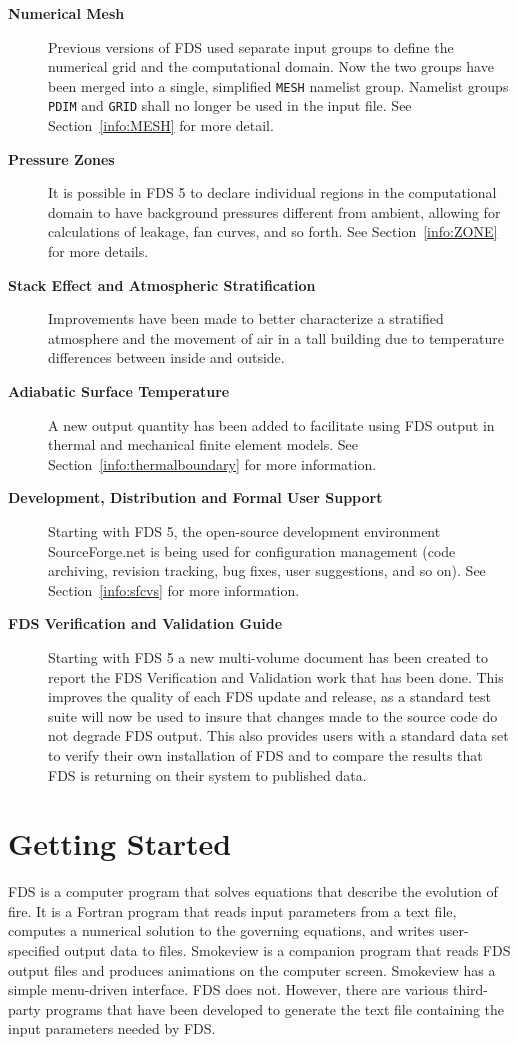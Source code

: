 \documentclass[11pt]{book}
\newcommand{\ct}{\tt\small}
\begin{document}
\begin{description}
\item[{\bf Numerical Mesh}] Previous versions of FDS used separate input groups
to define the numerical grid and the computational domain.  Now the two groups
have been merged into a single, simplified {\ct MESH} namelist group. Namelist groups {\ct PDIM} and
{\ct GRID} shall no longer be used in the input file.  See Section~\ref{info:MESH} for more detail.

\item[{\bf Pressure Zones}] It is possible in FDS 5 to declare individual
regions in the computational domain to have background pressures different from ambient,
allowing for calculations of leakage, fan curves, and so forth. See Section~\ref{info:ZONE} for more details.

\item[{\bf Stack Effect and Atmospheric Stratification}] Improvements have been made to
better characterize a stratified atmosphere and the movement of air in a tall building due
to temperature differences between inside and outside.

\item[{\bf Adiabatic Surface Temperature}] A new output quantity has been added to
facilitate using FDS output in thermal and mechanical finite element models.
See Section~\ref{info:thermalboundary} for more information.

\item[{\bf Development, Distribution and Formal User Support}] Starting with FDS 5, the open-source
development environment SourceForge.net is being used for configuration management
(code archiving, revision tracking, bug fixes, user suggestions, and so on).
See Section~\ref{info:sfcvs} for more information.

\item[{\bf FDS Verification and Validation Guide}] Starting with FDS 5 a new multi-volume document has
been created to report the FDS Verification and Validation work that has been done.  This improves the
quality of each FDS update and release, as a standard test suite will now be used to insure that changes
made to the source code do not degrade FDS output.  This also provides users with a standard
data set to verify their own installation of FDS and to compare the results that FDS is returning
on their system to published data.
\end{description}


\chapter{Getting Started}
\label{info:gettingstarted}
FDS is a computer program that solves equations that describe the evolution of fire.
It is a Fortran program that reads input parameters from a text file, computes
a numerical solution to the governing equations, and writes user-specified output data to files.
Smokeview is a companion program that reads FDS output files and produces animations on the computer screen.
Smokeview has a simple menu-driven interface. FDS does not. However, there are various third-party programs
that have been developed to generate the text file containing the input parameters needed by FDS.
\end{document}
